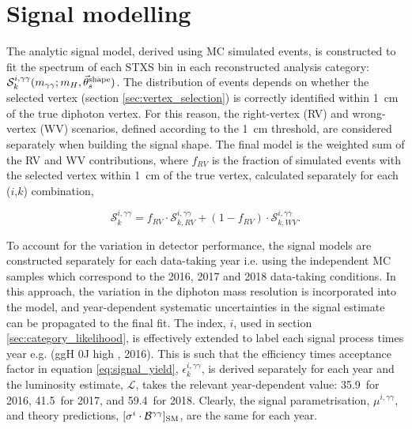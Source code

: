 \section{Signal modelling}\label{sec:sig_modelling}
The analytic signal model, derived using MC simulated events, is constructed to fit the \mgg spectrum of each STXS bin in each reconstructed analysis category: $\mathcal{S}^{i,\gamma\gamma}_k(m_{\gamma\gamma};m_H,\vec{\theta}^{\rm{shape}}_s)$. The distribution of events depends on whether the selected vertex (section \ref{sec:vertex_selection}) is correctly identified within 1~cm of the true diphoton vertex. For this reason, the right-vertex (RV) and wrong-vertex (WV) scenarios, defined according to the 1~cm threshold, are considered separately when building the signal shape. The final model is the weighted sum of the RV and WV contributions, where $f_{RV}$ is the fraction of simulated events with the selected vertex within 1~cm of the true vertex, calculated separately for each ($i$,$k$) combination,

\begin{equation}
    \mathcal{S}^{i,\gamma\gamma}_k = f_{RV} \cdot \mathcal{S}^{i,\gamma\gamma}_{k,RV} + (1-f_{RV}) \cdot\mathcal{S}^{i,\gamma\gamma}_{k,WV}.
\end{equation}

To account for the variation in detector performance, the signal models are constructed separately for each data-taking year i.e. using the independent MC samples which correspond to the 2016, 2017 and 2018 data-taking conditions. In this approach, the variation in the diphoton mass resolution is incorporated into the model, and year-dependent systematic uncertainties in the signal estimate can be propagated to the final fit. The index, $i$, used in section \ref{sec:category_likelihood}, is effectively extended to label each signal process times year e.g. (ggH 0J high \ptH, 2016). This is such that the efficiency times acceptance factor in equation \ref{eq:signal_yield}, $\epsilon_k^{i,\gamma\gamma}$, is derived separately for each year and the luminosity estimate, $\mathcal{L}$, takes the relevant year-dependent value: 35.9~\fbinv for 2016, 41.5~\fbinv for 2017, and 59.4~\fbinv for 2018. Clearly, the signal parametrisation, $\mu^{i,\gamma\gamma}$, and theory predictions, $[\sigma^i \cdot \mathcal{B}^{\gamma\gamma}]_{\rm{SM}}$, are the same for each year.

